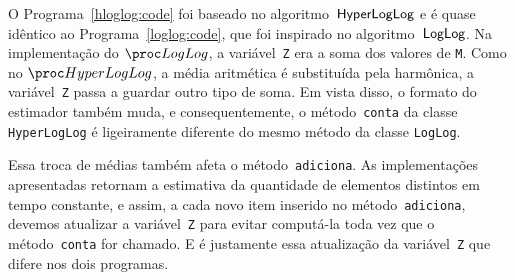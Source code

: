 O Programa~\ref{hloglog:code} foi baseado no algoritmo~$\textsf{HyperLogLog}$ e é quase idêntico ao Programa~\ref{loglog:code}, 
que foi inspirado no algoritmo~$\textsf{LogLog}$. Na implementação do $\LOG$, a variável~\texttt{Z} era a soma dos valores 
de \texttt{M}. Como no $\HLOG$, a média aritmética é substituída pela harmônica, a variável~\texttt{Z} passa a guardar 
outro tipo de soma. Em vista disso, o formato do estimador também muda, e consequentemente, o método~\texttt{conta} da 
classe \texttt{HyperLogLog} é ligeiramente diferente do mesmo método da classe \texttt{LogLog}.

Essa troca de médias também afeta o método~\texttt{adiciona}. As implementações apresentadas retornam a estimativa da 
quantidade de elementos distintos em tempo constante, e assim, a cada novo item inserido no método~\texttt{adiciona}, 
devemos atualizar a variável~\texttt{Z} para evitar computá-la toda vez que o método~\texttt{conta} for chamado. E é 
justamente essa atualização da variável~\texttt{Z} que difere nos dois programas.